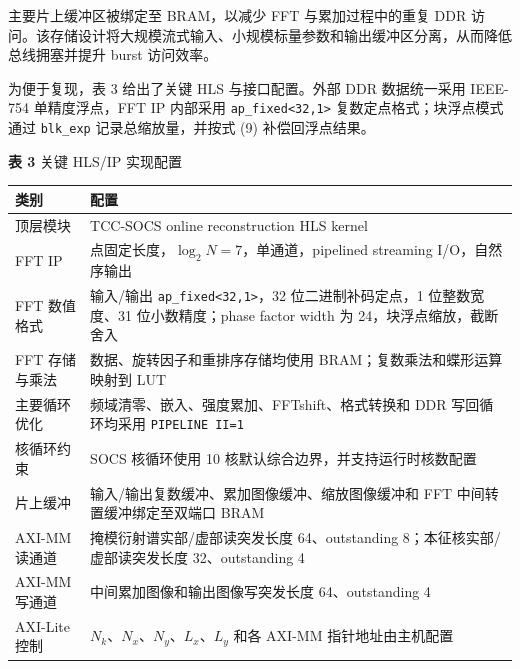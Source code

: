 \documentclass[
  preprint]{elsarticle}
\newcounter{none} %
\begin{document}
主要片上缓冲区被绑定至 BRAM，以减少 FFT 与累加过程中的重复 DDR
访问。该存储设计将大规模流式输入、小规模标量参数和输出缓冲区分离，从而降低总线拥塞并提升
burst 访问效率。

为便于复现，表 3 给出了关键 HLS 与接口配置。外部 DDR 数据统一采用
IEEE-754 单精度浮点，FFT IP 内部采用
\texttt{ap\_fixed\textless{}32,1\textgreater{}}
复数定点格式；块浮点模式通过 \texttt{blk\_exp} 记录总缩放量，并按式 (9)
补偿回浮点结果。

\textbf{表 3} 关键 HLS/IP 实现配置

{\def\LTcaptype{none} %
\begin{longtable}[]{@{}
  >{\raggedright\arraybackslash}p{}
  >{\raggedright\arraybackslash}p{}@{}}
\toprule\noalign{}
\begin{minipage}[b]{\linewidth}\raggedright
类别
\end{minipage} & \begin{minipage}[b]{\linewidth}\raggedright
配置
\end{minipage} \\
\midrule\noalign{}
\endhead
\bottomrule\noalign{}
\endlastfoot
顶层模块 & TCC-SOCS online reconstruction HLS kernel \\
FFT IP & 128 点固定长度，\(\log_2 N=7\)，单通道，pipelined streaming
I/O，自然序输出 \\
FFT 数值格式 & 输入/输出
\texttt{ap\_fixed\textless{}32,1\textgreater{}}，32 位二进制补码定点，1
位整数宽度、31 位小数精度；phase factor width 为
24，块浮点缩放，截断舍入 \\
FFT 存储与乘法 & 数据、旋转因子和重排序存储均使用
BRAM；复数乘法和蝶形运算映射到 LUT \\
主要循环优化 & 频域清零、嵌入、强度累加、FFTshift、格式转换和 DDR
写回循环均采用 \texttt{PIPELINE\ II=1} \\
核循环约束 & SOCS 核循环使用 10 核默认综合边界，并支持运行时核数配置 \\
片上缓冲 & 输入/输出复数缓冲、累加图像缓冲、缩放图像缓冲和 FFT
中间转置缓冲绑定至双端口 BRAM \\
AXI-MM 读通道 & 掩模衍射谱实部/虚部读突发长度 64、outstanding
8；本征核实部/虚部读突发长度 32、outstanding 4 \\
AXI-MM 写通道 & 中间累加图像和输出图像写突发长度 64、outstanding 4 \\
AXI-Lite 控制 & \(N_k\)、\(N_x\)、\(N_y\)、\(L_x\)、\(L_y\) 和各 AXI-MM
指针地址由主机配置 \\
\end{longtable}
}
\end{document}
